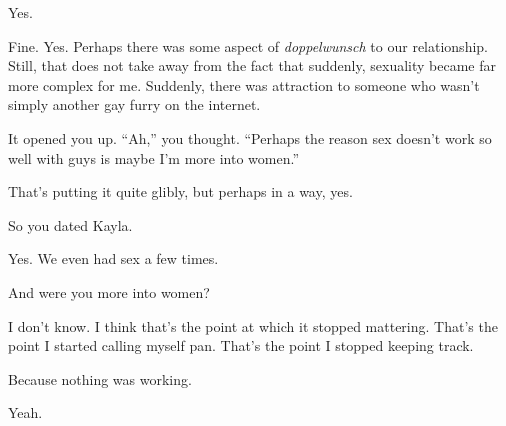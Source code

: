 \begin{paracol}{2}
\begin{leftcolumn}
\begin{ally}
Yes.
\end{ally}
Fine. Yes. Perhaps there was some aspect of \emph{doppelwunsch} to our relationship. Still, that does not take away from the fact that suddenly, sexuality became far more complex for me. Suddenly, there was attraction to someone who wasn't simply another gay furry on the internet.

\begin{ally}
It opened you up. ``Ah,'' you thought. ``Perhaps the reason sex doesn't work so well with guys is maybe I'm more into women.''
\end{ally}
That's putting it quite glibly, but perhaps in a way, yes.

\begin{ally}
So you dated Kayla.
\end{ally}
Yes. We even had sex a few times.

\begin{ally}
And were you more into women?
\end{ally}
I don't know. I think that's the point at which it stopped mattering. That's the point I started calling myself pan. That's the point I stopped keeping track.

\begin{ally}
Because nothing was working.
\end{ally}
Yeah.
\newpage
\end{leftcolumn}
\end{paracol}

